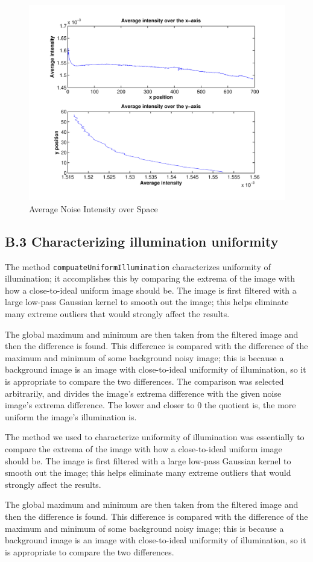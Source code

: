 \documentclass{article}
\begin{document}
\begin{figure}[h]
\centering
\includegraphics[width=0.45\linewidth]{figures/noise_over_space.pdf}
\caption{Average Noise Intensity over Space}
\label{fig:noise_intensity_space}
\end{figure}


\subsection*{B.3 Characterizing illumination uniformity}

The method \texttt{compuateUniformIllumination} characterizes uniformity of illumination; it accomplishes this by comparing the extrema of the image with how a close-to-ideal uniform image should be. The image is first filtered with a large low-pass Gaussian kernel to smooth out the image; this helps eliminate many extreme outliers that would strongly affect the results.

The global maximum and minimum are then taken from the filtered image and then the difference is found. This difference is compared with the difference of the maximum and minimum of some background noisy image; this is because a background image is an image with close-to-ideal uniformity of illumination, so it is appropriate to compare the two differences. The comparison was selected arbitrarily, and divides the image's extrema difference with the given noise image's extrema difference. The lower and closer to 0 the quotient is, the more uniform the image's illumination is.

The method we used to characterize uniformity of illumination was essentially to compare the extrema of the image with how a close-to-ideal uniform image should be. The image is first filtered with a large low-pass Gaussian kernel to smooth out the image; this helps eliminate many extreme outliers that would strongly affect the results.

The global maximum and minimum are then taken from the filtered image and then the difference is found.  This difference is compared with the difference of the maximum and minimum of some background noisy image; this is because a background image is an image with close-to-ideal uniformity of illumination, so it is appropriate to compare the two differences.
\end{document}
